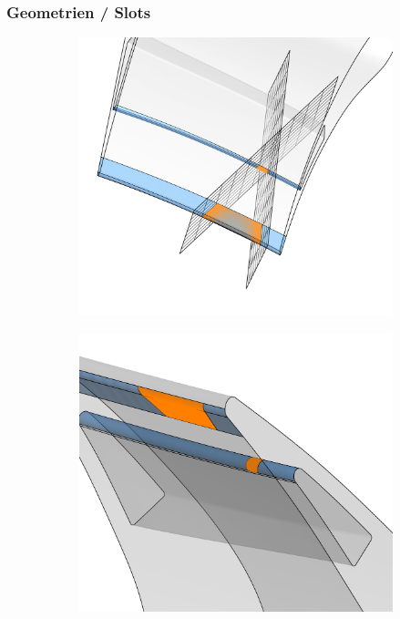 \documentclass[8pt, aspectratio=169]{beamer}
\begin{document}
\begin{frame}
	\frametitle{Geometrien / Slots}
	\vspace{0cm}\hspace{-0.5cm}
	\begin{figure}[H]
		\centering
		\begin{subfigure}{.45\textwidth}
			\includegraphics[width=\textwidth]{../../tec/slots/15.png}
		\end{subfigure}
		\phantom{aaa}
		\begin{subfigure}{.45\textwidth}
			\includegraphics[width=\textwidth]{../../tec/slots/14.png}
		\end{subfigure}
	\end{figure}
	\vfill
\end{frame}
\end{document}
